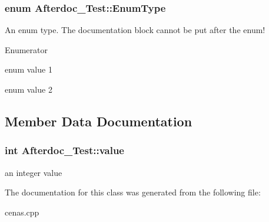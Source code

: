 \subsubsection[{\texorpdfstring{Enum\+Type}{EnumType}}]{\setlength{\rightskip}{0pt plus 5cm}enum {\bf Afterdoc\+\_\+\+Test\+::\+Enum\+Type}}\hypertarget{classAfterdoc__Test_adab0cd7ad3b4875e245ca8f6238a388a}{}\label{classAfterdoc__Test_adab0cd7ad3b4875e245ca8f6238a388a}
An enum type. The documentation block cannot be put after the enum! \begin{Desc}
\item[Enumerator]\par
\begin{description}
\item[{\em 
E\+Val1\hypertarget{classAfterdoc__Test_adab0cd7ad3b4875e245ca8f6238a388aae054276790e35692ad0abe10c5b75da4}{}\label{classAfterdoc__Test_adab0cd7ad3b4875e245ca8f6238a388aae054276790e35692ad0abe10c5b75da4}
}]enum value 1 \item[{\em 
E\+Val2\hypertarget{classAfterdoc__Test_adab0cd7ad3b4875e245ca8f6238a388aac849f37624d8d2d68ca72c4a8df9cf99}{}\label{classAfterdoc__Test_adab0cd7ad3b4875e245ca8f6238a388aac849f37624d8d2d68ca72c4a8df9cf99}
}]enum value 2 \end{description}
\end{Desc}


\subsection{Member Data Documentation}
\subsubsection[{\texorpdfstring{value}{value}}]{\setlength{\rightskip}{0pt plus 5cm}int Afterdoc\+\_\+\+Test\+::value\hspace{0.3cm}{\ttfamily [protected]}}\hypertarget{classAfterdoc__Test_a9287a08830e5cdfd9c732bb7932694a0}{}\label{classAfterdoc__Test_a9287a08830e5cdfd9c732bb7932694a0}
an integer value 

The documentation for this class was generated from the following file\+:\begin{DoxyCompactItemize}
\item 
cenas.\+cpp\end{DoxyCompactItemize}
